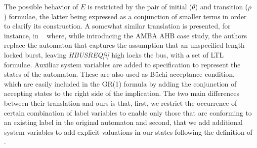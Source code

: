 The possible behavior of $E$ is restricted by the pair of initial ($\theta$) and transition ($\rho$) formulae, the latter being expressed as a conjunction of smaller terms in order to clarify its construction.  
A somewhat similar translation is presented, for instance, in ~\cite{bloem2012synthesis} where, while introducing the AMBA AHB case study, the authors replace the automaton that captures the assumption that an unspecified length locked burst, leaving \emph{HBUSREQ[i]} high locks the bus, with a set of LTL formulae. Auxiliar system variables are added to specification to represent the states of the automaton. These are also used as Büchi acceptance condition, which are easily included in the GR(1) formula by adding the conjunction of accepting states to the right side of the implication.
The two main differences between their translation and ours is that, first, we restrict the occurrence of certain combination of label variables to enable only those that are conforming to an existing label in the original automaton and second, that we add additional system variables to add explicit valuations in our states following the definition of \valuations.

